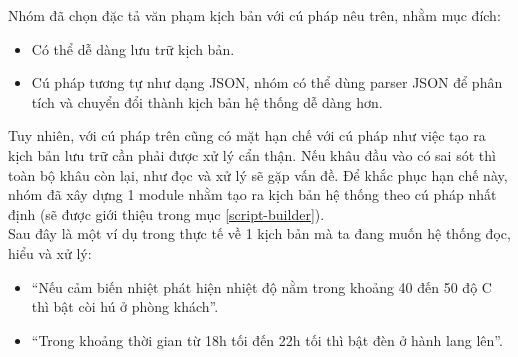 \documentclass[12pt,a4paper,oneside]{extbook}
\begin{document}
%	
%	
%	
%	
%	
%	
%	
%	

\noindent
Nhóm đã chọn đặc tả văn phạm kịch bản với cú pháp nêu trên, nhằm mục đích:
\begin{itemize}[topsep=1mm,itemsep=-0.5mm]
\item Có thể dễ dàng lưu trữ kịch bản.
\item Cú pháp tương tự như dạng JSON, nhóm có thể dùng parser JSON để phân tích và chuyển đổi thành kịch bản hệ thống dễ dàng hơn.
\vspace{1mm}
\end{itemize}

\noindent
Tuy nhiên, với cú pháp trên cũng có mặt hạn chế với cú pháp như việc tạo ra kịch bản lưu trữ cần phải được xử lý cẩn thận. Nếu khâu đầu vào có sai sót thì toàn bộ khâu còn lại, như đọc và xử lý sẽ gặp vấn đề. Để khắc phục hạn chế này, nhóm đã xây dựng 1 module nhằm tạo ra kịch bản hệ thống theo cú pháp nhất định (sẽ được giới thiệu trong mục \ref{script-builder}).\\

\noindent
Sau đây là một ví dụ trong thực tế về 1 kịch bản mà ta đang muốn hệ thống đọc, hiểu và xử lý:

\begin{itemize}[topsep=1mm,itemsep=-0.5mm]
\item “Nếu cảm biến nhiệt phát hiện nhiệt độ nằm trong khoảng 40 đến 50 độ C thì bật còi hú ở phòng khách”.
\item “Trong khoảng thời gian từ 18h tối đến 22h tối thì bật đèn ở hành lang lên”.
\vspace{1mm}
\end{itemize}
\end{document}
